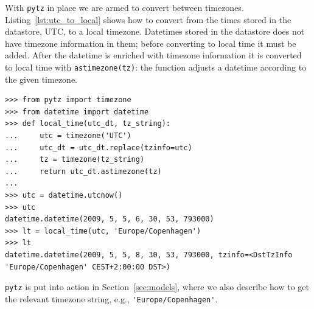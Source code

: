 With \verb|pytz| in place we are armed to convert between
timezones. Listing~\ref{lst:utc_to_local} shows how to convert from the times
stored in the datastore, UTC, to a local timezone. Datetimes stored in the datastore
does not have timezone information in them; before converting to local time it
must be added. After the datetime is enriched with timezone information it is
converted to local time with \verb|astimezone(tz)|: the function adjusts a
datetime according to the given timezone.

\begin{lstlisting}[caption=Converting datastore time to localtime,label=lst:utc_to_local]
>>> from pytz import timezone
>>> from datetime import datetime
>>> def local_time(utc_dt, tz_string):
...     utc = timezone('UTC')
...     utc_dt = utc_dt.replace(tzinfo=utc)
...     tz = timezone(tz_string)
...     return utc_dt.astimezone(tz)
...
>>> utc = datetime.utcnow()
>>> utc
datetime.datetime(2009, 5, 5, 6, 30, 53, 793000)
>>> lt = local_time(utc, 'Europe/Copenhagen')
>>> lt
datetime.datetime(2009, 5, 5, 8, 30, 53, 793000, tzinfo=<DstTzInfo 'Europe/Copenhagen' CEST+2:00:00 DST>)
\end{lstlisting}

\verb|pytz| is put into action in Section~\ref{sec:models}, where we also
describe how to get the relevant timezone string, e.g.,
\verb|'Europe/Copenhagen'|.







